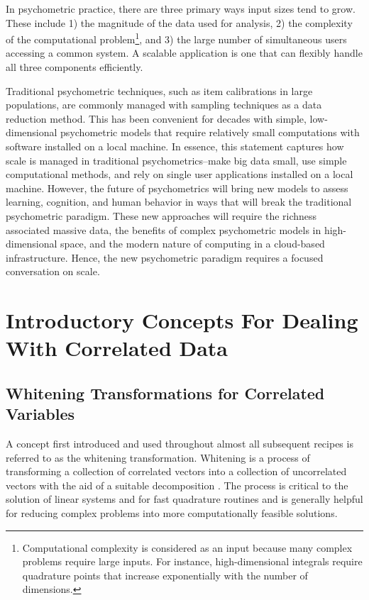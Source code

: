 \documentclass[12pt]{article}
\begin{document}
In psychometric practice, there are three primary ways input sizes tend to grow. These include 1) the magnitude of the data used for analysis, 2) the complexity of the computational problem\footnote{Computational complexity is considered as an input because many complex problems require large inputs. For instance, high-dimensional integrals require quadrature points that increase exponentially with the number of dimensions.}, and 3) the large number of simultaneous users accessing a common system. A scalable application is one that can flexibly handle all three components efficiently. 

Traditional psychometric techniques, such as item calibrations in large populations, are commonly managed with sampling techniques as a data reduction method. This has been convenient for decades with simple, low-dimensional psychometric models that require relatively small computations with software installed on a local machine. In essence, this statement captures how scale is managed in traditional psychometrics--make big data small, use simple computational methods, and rely on single user applications installed on a local machine. However, the future of psychometrics will bring new models to assess learning, cognition, and human behavior in ways that will break the traditional psychometric paradigm. These new approaches will require the richness associated massive data, the benefits of complex psychometric models in high-dimensional space, and the modern nature of computing in a cloud-based infrastructure.  Hence, the new psychometric paradigm requires a focused conversation on scale. 

\section*{Introductory Concepts For Dealing With Correlated Data}

\subsection*{Whitening Transformations for Correlated Variables}

A concept first introduced and used throughout almost all subsequent recipes is referred to as the whitening transformation. Whitening is a process of transforming a collection of correlated vectors into a collection of uncorrelated vectors with the aid of a suitable decomposition \cite{whiten}. The process is critical to the solution of linear systems and for fast quadrature routines and is generally helpful for reducing complex problems into more computationally feasible solutions. 
\end{document}
